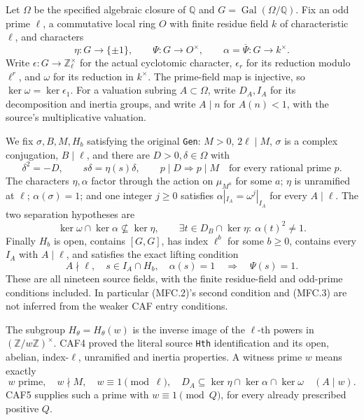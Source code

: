 Let \(\Omega\) be the specified algebraic closure of \(\mathbb Q\)
and \(G=\operatorname{Gal}(\Omega/\mathbb Q)\).  Fix an odd prime
\(\ell\), a commutative local ring \(O\) with finite residue field
\(k\) of characteristic \(\ell\), and characters
\[
 \eta:G\longrightarrow\{\pm1\},\qquad
 \Psi:G\longrightarrow O^\times,\qquad
 \alpha=\overline\Psi:G\longrightarrow k^\times.
\]
Write \(\epsilon:G\to\mathbb Z_\ell^\times\) for the actual
cyclotomic character, \(\epsilon_r\) for its reduction modulo
\(\ell^r\), and \(\omega\) for its reduction in \(k^\times\).
The prime-field map is injective, so
\(\ker\omega=\ker\epsilon_1\).
For a valuation subring \(A\subset\Omega\), write \(D_A,I_A\)
for its decomposition and inertia groups, and write \(A\mid n\)
for \(A(n)<1\), with the source's multiplicative valuation.

We fix \(\sigma,B,M,H_b\) satisfying the original \texttt{Gen}:
\(M>0\), \(2\ell\mid M\), \(\sigma\) is a complex conjugation,
\(B\mid\ell\), and there are \(D>0,\delta\in\Omega\) with
\[
 \delta^2=-D,\qquad s\delta=\eta(s)\delta,
 \qquad p\mid D\Longrightarrow p\mid M
 \quad\text{for every rational prime }p.                  \tag{MFC.1}
\]
The characters \(\eta,\alpha\) factor through the action on
\(\mu_{M^a}\) for some \(a\); \(\eta\) is unramified at
\(\ell\); \(\alpha(\sigma)=1\); and one integer \(j\ge0\)
satisfies \(\alpha|_{I_A}=\omega^j|_{I_A}\) for every
\(A\mid\ell\).  The two separation hypotheses are
\[
 \ker\omega\cap\ker\alpha\not\subseteq\ker\eta,
 \qquad
 \exists t\in D_B\cap\ker\eta:\ \alpha(t)^2\ne1.          \tag{MFC.2}
\]
Finally \(H_b\) is open, contains \([G,G]\), has index
\(\ell^b\) for some \(b\ge0\), contains every \(I_A\) with
\(A\mid\ell\), and satisfies the exact lifting condition
\[
 A\nmid\ell,\quad s\in I_A\cap H_b,\quad\alpha(s)=1
                  \quad\Longrightarrow\quad\Psi(s)=1.      \tag{MFC.3}
\]
These are all nineteen source fields, with the finite residue-field
and odd-prime conditions included.  In particular (MFC.2)'s second
condition and (MFC.3) are not inferred from the weaker CAF entry
conditions.

The subgroup \(H_\theta=H_\theta(w)\) is the inverse image of
the \(\ell\)-th powers in \((\mathbb Z/w\mathbb Z)^\times\).
CAF4 proved the literal source \texttt{Hth} identification and its
open, abelian, index-\(\ell\), unramified and inertia properties.
A witness prime \(w\) means exactly
\[
 w\text{ prime},\quad w\nmid M,\quad w\equiv1\pmod\ell,
 \quad D_A\subseteq\ker\eta\cap\ker\alpha\cap\ker\omega
                     \quad(A\mid w).                       \tag{MFC.4}
\]
CAF5 supplies such a prime with \(w\equiv1\pmod Q\), for every
already prescribed positive \(Q\).

